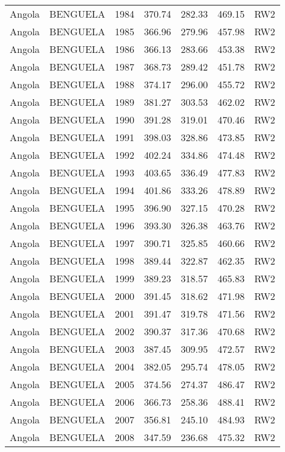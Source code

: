 \begin{longtable}{lllrrrl}
  Angola & BENGUELA & 1984 & 370.74 & 282.33 & 469.15 & RW2 \\ 
  Angola & BENGUELA & 1985 & 366.96 & 279.96 & 457.98 & RW2 \\ 
  Angola & BENGUELA & 1986 & 366.13 & 283.66 & 453.38 & RW2 \\ 
  Angola & BENGUELA & 1987 & 368.73 & 289.42 & 451.78 & RW2 \\ 
  Angola & BENGUELA & 1988 & 374.17 & 296.00 & 455.72 & RW2 \\ 
  Angola & BENGUELA & 1989 & 381.27 & 303.53 & 462.02 & RW2 \\ 
  Angola & BENGUELA & 1990 & 391.28 & 319.01 & 470.46 & RW2 \\ 
  Angola & BENGUELA & 1991 & 398.03 & 328.86 & 473.85 & RW2 \\ 
  Angola & BENGUELA & 1992 & 402.24 & 334.86 & 474.48 & RW2 \\ 
  Angola & BENGUELA & 1993 & 403.65 & 336.49 & 477.83 & RW2 \\ 
  Angola & BENGUELA & 1994 & 401.86 & 333.26 & 478.89 & RW2 \\ 
  Angola & BENGUELA & 1995 & 396.90 & 327.15 & 470.28 & RW2 \\ 
  Angola & BENGUELA & 1996 & 393.30 & 326.38 & 463.76 & RW2 \\ 
  Angola & BENGUELA & 1997 & 390.71 & 325.85 & 460.66 & RW2 \\ 
  Angola & BENGUELA & 1998 & 389.44 & 322.87 & 462.35 & RW2 \\ 
  Angola & BENGUELA & 1999 & 389.23 & 318.57 & 465.83 & RW2 \\ 
  Angola & BENGUELA & 2000 & 391.45 & 318.62 & 471.98 & RW2 \\ 
  Angola & BENGUELA & 2001 & 391.47 & 319.78 & 471.56 & RW2 \\ 
  Angola & BENGUELA & 2002 & 390.37 & 317.36 & 470.68 & RW2 \\ 
  Angola & BENGUELA & 2003 & 387.45 & 309.95 & 472.57 & RW2 \\ 
  Angola & BENGUELA & 2004 & 382.05 & 295.74 & 478.05 & RW2 \\ 
  Angola & BENGUELA & 2005 & 374.56 & 274.37 & 486.47 & RW2 \\ 
  Angola & BENGUELA & 2006 & 366.73 & 258.36 & 488.41 & RW2 \\ 
  Angola & BENGUELA & 2007 & 356.81 & 245.10 & 484.93 & RW2 \\ 
  Angola & BENGUELA & 2008 & 347.59 & 236.68 & 475.32 & RW2 \\ 

\end{longtable}
